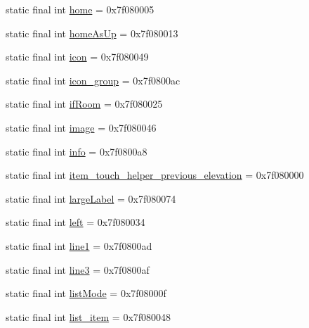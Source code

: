 \begin{CompactItemize}
static final int \hyperlink{classandroid_1_1support_1_1graphics_1_1drawable_1_1_r_1_1id_da0a539ee1f6445bf451e33e6008e894}{home} = 0x7f080005
\item 
static final int \hyperlink{classandroid_1_1support_1_1graphics_1_1drawable_1_1_r_1_1id_3980e3ea25b7fb1cfed015dfbdbfc6eb}{homeAsUp} = 0x7f080013
\item 
static final int \hyperlink{classandroid_1_1support_1_1graphics_1_1drawable_1_1_r_1_1id_2705726d320423401bee24a9579d8f51}{icon} = 0x7f080049
\item 
static final int \hyperlink{classandroid_1_1support_1_1graphics_1_1drawable_1_1_r_1_1id_ce68d1ff5ffab41be748bf4c4e69586c}{icon\_\-group} = 0x7f0800ac
\item 
static final int \hyperlink{classandroid_1_1support_1_1graphics_1_1drawable_1_1_r_1_1id_15c2a60da8e00d2d9821d899b5c8d089}{ifRoom} = 0x7f080025
\item 
static final int \hyperlink{classandroid_1_1support_1_1graphics_1_1drawable_1_1_r_1_1id_70577654f53b33304ce8067bcbbb50ac}{image} = 0x7f080046
\item 
static final int \hyperlink{classandroid_1_1support_1_1graphics_1_1drawable_1_1_r_1_1id_84272180a30f4d65a294373ee1a537d8}{info} = 0x7f0800a8
\item 
static final int \hyperlink{classandroid_1_1support_1_1graphics_1_1drawable_1_1_r_1_1id_002e7c928a6968ff2d47b76ff12550aa}{item\_\-touch\_\-helper\_\-previous\_\-elevation} = 0x7f080000
\item 
static final int \hyperlink{classandroid_1_1support_1_1graphics_1_1drawable_1_1_r_1_1id_7dbade53eab688cd964b899edf62adee}{largeLabel} = 0x7f080074
\item 
static final int \hyperlink{classandroid_1_1support_1_1graphics_1_1drawable_1_1_r_1_1id_2024fccaef81061bbc115dc8ae127edd}{left} = 0x7f080034
\item 
static final int \hyperlink{classandroid_1_1support_1_1graphics_1_1drawable_1_1_r_1_1id_7e88b934e9c65e227ccb9412623a8140}{line1} = 0x7f0800ad
\item 
static final int \hyperlink{classandroid_1_1support_1_1graphics_1_1drawable_1_1_r_1_1id_43c24496aa1d43d241d785b5afd19471}{line3} = 0x7f0800af
\item 
static final int \hyperlink{classandroid_1_1support_1_1graphics_1_1drawable_1_1_r_1_1id_655ab470a39f8fdd4bfc12563386c5cf}{listMode} = 0x7f08000f
\item 
static final int \hyperlink{classandroid_1_1support_1_1graphics_1_1drawable_1_1_r_1_1id_adcc9f800f532201631eed599d5ce7aa}{list\_\-item} = 0x7f080048

\end{CompactItemize}
